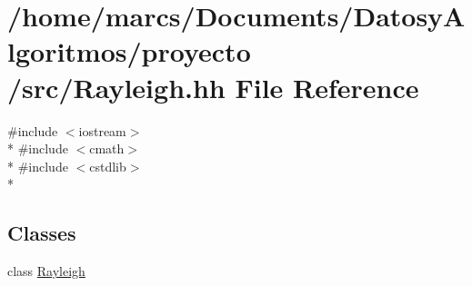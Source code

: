 \hypertarget{_rayleigh_8hh}{\section{/home/marcs/\-Documents/\-Datosy\-Algoritmos/proyecto /src/\-Rayleigh.hh File Reference}
\label{_rayleigh_8hh}
}
{\ttfamily \#include $<$iostream$>$}\\*
{\ttfamily \#include $<$cmath$>$}\\*
{\ttfamily \#include $<$cstdlib$>$}\\*
\subsection*{Classes}
\begin{DoxyCompactItemize}
\item 
class \hyperlink{class_rayleigh}{Rayleigh}
\end{DoxyCompactItemize}
